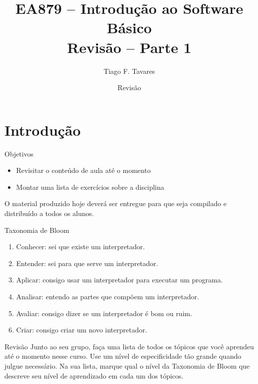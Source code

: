 \documentclass{beamer}
\title[Revisão 1]{EA879 -- Introdução ao Software Básico\\Revisão -- Parte 1}
\author{Tiago F. Tavares}
\institute{FEEC -- UNICAMP}
\date{Revisão}
\begin{document}
\begin{frame}
  \titlepage
\end{frame}


\section{Introdução}

\begin{frame}{Objetivos}
  \Large
  \begin{itemize}
    \item Revisitar o conteúdo de aula até o momento
    \item Montar uma lista de exercícios sobre a disciplina
  \end{itemize}
  O material produzido hoje deverá ser entregue para que seja compilado e
  distribuído a todos os alunos.
\end{frame}

\begin{frame}[fragile]{Taxonomia de Bloom}
  \centering
  \large
  \begin{enumerate}
  \item Conhecer: sei que existe um interpretador.
  \item Entender: sei para que serve um interpretador.
  \item Aplicar: consigo usar um interpretador para executar um programa.
  \item Analisar: entendo as partes que compõem um interpretador.
  \item Avaliar: consigo dizer se um interpretador é bom ou ruim.
  \item Criar: consigo criar um novo interpretador.
  \end{enumerate}
\end{frame}


\begin{frame}[fragile]{Revisão}
  \centering
  \Large
  Junto ao seu grupo, faça uma lista de todos os tópicos que você aprendeu até o
  momento nesse curso. Use um nível de especificidade tão grande quando julgue
  necessário. Na sua lista, marque qual o nível da Taxonomia de Bloom
  que descreve seu nível de aprendizado em cada um dos tópicos.
\end{frame}
\end{document}
